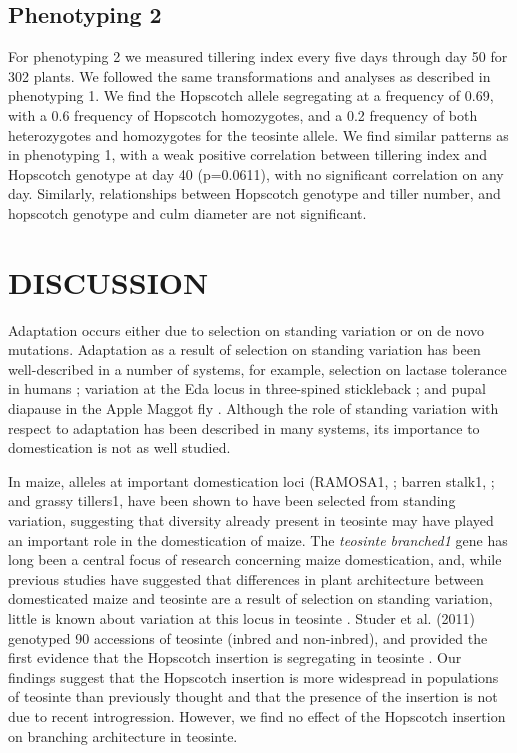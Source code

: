 \documentclass[12pt]{article}
\begin{document}
\subsection{Phenotyping 2}

For phenotyping 2 we measured tillering index every five days through day 50 for 302 plants. We followed the same transformations and analyses as described in phenotyping 1. We find the Hopscotch allele segregating at a frequency of 0.69, with a 0.6 frequency of Hopscotch homozygotes, and a 0.2 frequency of both heterozygotes and homozygotes for the teosinte allele. We find similar patterns as in phenotyping 1, with a weak positive correlation between tillering index and Hopscotch genotype at day 40 (p=0.0611), with no significant correlation on any day. Similarly, relationships between Hopscotch genotype and tiller number, and hopscotch genotype and culm diameter are not significant. 


\section{DISCUSSION}

Adaptation occurs either due to selection on standing variation or on de novo mutations. Adaptation as a result of selection on standing variation has been well-described in a number of systems, for example, selection on lactase tolerance in humans \cite{Plantinga et al 2012, Tishkoff et al 2007}; variation at the Eda locus in three-spined stickleback \cite{Kitano et al 2008, Colosimo et al 2005}; and pupal diapause in the Apple Maggot fly \cite{Feder et al 2003}. Although the role of standing variation with respect to adaptation has been described in many systems, its importance to domestication is not as well studied. 

In maize, alleles at important domestication loci (RAMOSA1, \cite{Sigmon and Vollbrecht 2010}; barren stalk1, \cite{Gallavotti et al 2004}; and grassy tillers1, \cite{Whipple et al 2011} have been shown to have been selected from standing variation, suggesting that diversity already present in teosinte may have played an important role in the domestication of maize. The \emph{teosinte branched1} gene has long been a central focus of research concerning maize domestication, and, while previous studies have suggested that differences in plant architecture between domesticated maize and teosinte are a result of selection on standing variation, little is known about variation at this locus in teosinte \cite{Clark et al 2006, Studer et al 2011}. Studer et al. (2011) genotyped 90 accessions of teosinte (inbred and non-inbred), and provided the first evidence that the Hopscotch insertion is segregating in teosinte \cite{Studer et al 2011}. Our findings suggest that the Hopscotch insertion is more widespread in populations of teosinte than previously thought and that the presence of the insertion is not due to recent introgression. However, we find no effect of the Hopscotch insertion on branching architecture in teosinte. 
\end{document}
